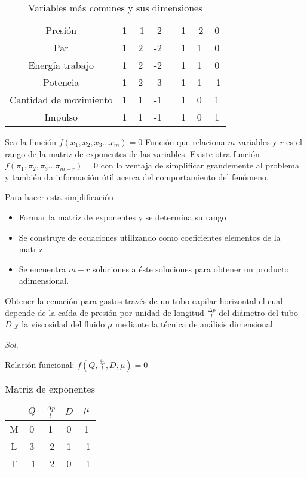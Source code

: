 \begin{table}[h!]
\begin{tabular}{@{}cccccccc@{}}
    Presión                  & 1  & -1 & -2 &  & 1  & -2 & 0  \\
    Par                      & 1  & 2  & -2 &  & 1  & 1  & 0  \\
    Energía trabajo          & 1  & 2  & -2 &  & 1  & 1  & 0  \\
    Potencia                 & 1  & 2  & -3 &  & 1  & 1  & -1 \\
    Cantidad de movimiento   & 1  & 1  & -1 &  & 1  & 0  & 1  \\
    Impulso                  & 1  & 1  & -1 &  & 1  & 0  & 1  \\ \bottomrule
    \end{tabular}
    \caption{Variables más comunes y sus dimensiones}
    \label{tabha2}
\end{table}
\begin{theorem}
    Sea la función $f\left(x_1,x_2,x_3\dots x_m\right)=0$
    Función que relaciona $m$ variables y $r$ es el rango de la matriz de exponentes de las variables. Existe otra función $f\left(\pi_1,\pi_2,\pi_3\dots\pi_{m-r}\right)=0$ con la ventaja de simplificar grandemente al problema y también da información útil acerca del comportamiento del fenómeno.
\end{theorem}

Para hacer esta simplificación
\begin{itemize}
    \item Formar la matriz de exponentes y se determina su rango
    \item Se construye de ecuaciones utilizando como coeficientes elementos de la matriz
    \item Se encuentra $m-r$ soluciones a éste soluciones para obtener un producto adimensional.
\end{itemize}

\begin{example}
    Obtener la ecuación para gastos través de un tubo capilar horizontal el cual depende de la caída de presión por unidad de longitud $\frac{\Delta p}{l}$ del diámetro del tubo $D$ y la viscosidad del fluido $\mu$ mediante la técnica de análisis dimensional
\end{example}

\textit{ Sol. }

Relación funcional: $f\left(Q,\frac{\delta p}{l},D,\mu\right)=0$
\begin{table}[h!]
    \centering
    \begin{tabular}{@{}ccccc@{}}
    \toprule
      & $Q$ & $\frac{\Delta p}{l}$ & $D$ & $\mu$ \\ \midrule
    M & 0   & 1                   & 0   & 1     \\
    L & 3   & -2                  & 1   & -1    \\
    T & -1  & -2                  & 0   & -1    \\ \bottomrule
    \end{tabular}
    \caption{Matriz de exponentes}
    \label{tabha3}
\end{table}

